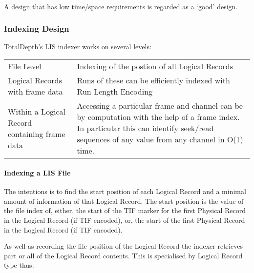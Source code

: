 \documentclass[letterpaper,10pt,english]{sphinxmanual}
\begin{document}
A design that has low time/space requirements is regarded as a ‘good’ design.


\subsubsection{Indexing Design}
\label{\detokenize{tech/LIS_indexing:indexing-design}}
TotalDepth’s LIS indexer works on several levels:


\begin{savenotes}\sphinxattablestart
\centering
\begin{tabulary}{\linewidth}[t]{|T|T|}
\hline
{}\relax &\relax \\
\hline
File Level
&
Indexing of the postion of all Logical Records
\\
\hline
Logical Records with frame data
&
Runs of these can be efficiently indexed with Run Length Encoding
\\
\hline
Within a Logical Record
containing frame data
&
Accessing a particular frame and channel can be by computation with the help
of a frame index. In particular this can identify seek/read sequences of any
value from any channel in O(1) time.
\\
\hline
\end{tabulary}
\par
\sphinxattableend\end{savenotes}


\paragraph{Indexing a LIS File}
\label{\detokenize{tech/LIS_indexing:indexing-a-lis-file}}
The intentions is to find the start position of each Logical Record and a minimal amount of information of that Logical Record. The start position is the  value of the file index of, either, the start of the TIF marker for the first Physical Record in the Logical Record (if TIF encoded), or, the start of the first Physical Record in the Logical Record (if  TIF encoded).

As well as recording the file position of the Logical Record the indexer retrieves part or all of the Logical Record contents. This is specialised by Logical Record type thus:
\end{document}
